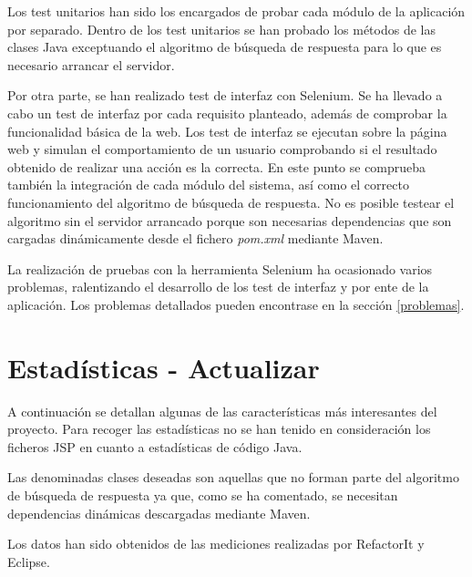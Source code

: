 Los test unitarios han sido los encargados de probar cada módulo de la aplicación por separado. Dentro de los test unitarios se han probado los métodos de las clases Java exceptuando el algoritmo de búsqueda de respuesta para lo que es necesario arrancar el servidor.

Por otra parte, se han realizado test de interfaz con Selenium. Se ha llevado a cabo un test de interfaz por cada requisito planteado, además de comprobar la funcionalidad básica de la web. Los test de interfaz se ejecutan sobre la página web y simulan el comportamiento de un usuario comprobando si el resultado obtenido de realizar una acción es la correcta. En este punto se comprueba también la integración de cada módulo del sistema, así como el correcto funcionamiento del algoritmo de búsqueda de respuesta. No es posible testear el algoritmo sin el servidor arrancado porque son necesarias dependencias que son cargadas dinámicamente desde el fichero \emph{pom.xml} mediante Maven.

La realización de pruebas con la herramienta Selenium ha ocasionado varios problemas, ralentizando el desarrollo de los test de interfaz y por ente de la aplicación. Los problemas detallados pueden encontrase en la sección \ref{problemas}.


\section{Estadísticas - Actualizar}

A continuación se detallan algunas de las características más interesantes del proyecto. Para recoger las estadísticas no se han tenido en consideración los ficheros JSP en cuanto a estadísticas de código Java.

Las denominadas clases deseadas son aquellas que no forman parte del algoritmo de búsqueda de respuesta ya que, como se ha comentado, se necesitan dependencias dinámicas descargadas mediante Maven.

Los datos han sido obtenidos de las mediciones realizadas por RefactorIt y Eclipse.

